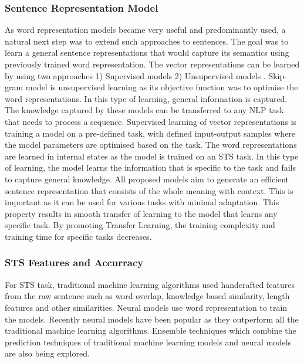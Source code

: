 \documentclass[12pt]{report} %
\begin{document}
\subsubsection{Sentence Representation Model}
As word representation models became very useful and predominantly used, a natural next step was to extend such approaches to sentences. The goal was to learn a general sentence representations that would capture its semantics using previously trained word representation.
The vector representations can be learned by using two approaches 1) Supervised models \citep{conneau2017supervised} 2) Unsupervised models \citep{kiros2015skip}. Skip-gram model is unsupervised learning as its objective function was to optimise the word representations. In this type of learning, general information is captured. The knowledge captured by these models can be transferred to any NLP task that needs to process a sequence. Supervised learning of vector representations is training a model on a pre-defined task, with defined input-output samples where the model parameters are optimised based on the task. The word representations are learned in internal states as the model is trained on an STS task. In this type of learning, the model learns the information that is specific to the task and fails to capture general knowledge. All proposed models aim to generate an efficient sentence representation that consists of the whole meaning with context. This is important as it can be used for various tasks with minimal adaptation. This property results in smooth transfer of learning to the model that learns any specific task. By promoting Transfer Learning, the training complexity and training time for specific tasks decreases.  

\subsubsection{STS Features and Accurracy}

For STS task, traditional machine learning algorithms used handcrafted features from the raw sentence such as word overlap, knowledge based similarity, length features and other similarities. Neural models use word representation to train the models. Recently neural models \cite{conneau2017supervised} \citealp{kiros2015skip} \cite{shao2017hcti} have been popular as they outperform all the traditional machine learning algorithms. Ensemble techniques which combine the prediction techniques of traditional machine learning models and neural models are also being explored.
\end{document}
